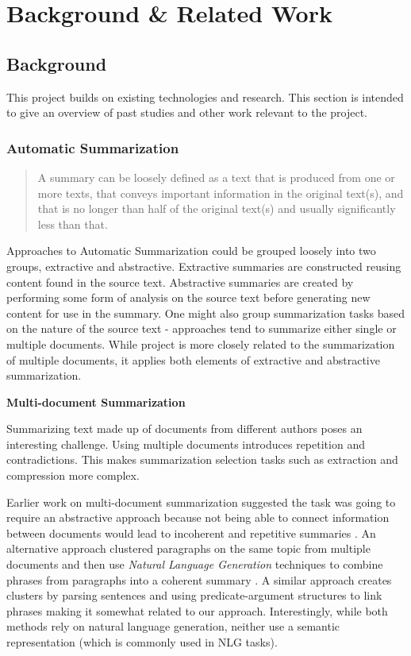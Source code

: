 \chapter{Background \& Related Work\label{chap:background-related}}
  \section{Background}
    This project builds on existing technologies and research. This section is intended to give an overview of past studies and other work relevant to the project.

    \tocless\subsection{Automatic Summarization}
      \blockquote{A summary can be loosely defined as a text that is produced from one or more texts, that conveys important information in the original text(s), and that is no longer than half of the original text(s) and usually significantly less than that.} \cite{radev2002introduction}

      Approaches to Automatic Summarization could be grouped loosely into two groups, extractive and abstractive. Extractive summaries are constructed reusing content found in the source text. Abstractive summaries are created by performing some form of analysis on the source text before generating new content for use in the summary. One might also group summarization tasks based on the nature of the source text - approaches tend to summarize either single or multiple documents. While project is more closely related to the summarization of multiple documents, it applies both elements of extractive and abstractive summarization.

      \noindent\textbf{Multi-document Summarization}

        \noindent Summarizing text made up of documents from different authors poses an interesting challenge. Using multiple documents introduces repetition and contradictions. This makes summarization selection tasks such as extraction and compression more complex.

        Earlier work on multi-document summarization suggested the task was going to require an abstractive approach because not being able to connect information between documents would lead to incoherent and repetitive summaries \cite{McKeown1999TMS315149315355}. An alternative approach clustered paragraphs on the same topic from multiple documents and then use \textit{Natural Language Generation} techniques to combine phrases from paragraphs into a coherent summary \cite{McKeown1999TMS315149315355}. A similar approach creates clusters by parsing sentences and using predicate-argument structures to link phrases \cite{barzilay1999information} making it somewhat related to our approach. Interestingly, while both methods rely on natural language generation, neither use a semantic representation (which is commonly used in NLG tasks).


